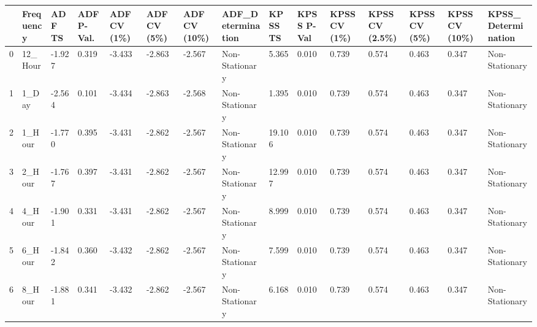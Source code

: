 \begin{tabular}{lllllllllllllll}
\toprule
 & Frequency & ADF TS & ADF P-Val. & ADF CV (1\%) & ADF CV (5\%) & ADF CV (10\%) & ADF_Determination & KPSS TS & KPSS P-Val & KPSS CV (1\%) & KPSS CV (2.5\%) & KPSS CV (5\%) & KPSS CV (10\%) & KPSS_Determination \\
\midrule
0 & 12_Hour & -1.927 & 0.319 & -3.433 & -2.863 & -2.567 & Non-Stationary & 5.365 & 0.010 & 0.739 & 0.574 & 0.463 & 0.347 & Non-Stationary \\
1 & 1_Day & -2.564 & 0.101 & -3.434 & -2.863 & -2.568 & Non-Stationary & 1.395 & 0.010 & 0.739 & 0.574 & 0.463 & 0.347 & Non-Stationary \\
2 & 1_Hour & -1.770 & 0.395 & -3.431 & -2.862 & -2.567 & Non-Stationary & 19.106 & 0.010 & 0.739 & 0.574 & 0.463 & 0.347 & Non-Stationary \\
3 & 2_Hour & -1.767 & 0.397 & -3.431 & -2.862 & -2.567 & Non-Stationary & 12.997 & 0.010 & 0.739 & 0.574 & 0.463 & 0.347 & Non-Stationary \\
4 & 4_Hour & -1.901 & 0.331 & -3.431 & -2.862 & -2.567 & Non-Stationary & 8.999 & 0.010 & 0.739 & 0.574 & 0.463 & 0.347 & Non-Stationary \\
5 & 6_Hour & -1.842 & 0.360 & -3.432 & -2.862 & -2.567 & Non-Stationary & 7.599 & 0.010 & 0.739 & 0.574 & 0.463 & 0.347 & Non-Stationary \\
6 & 8_Hour & -1.881 & 0.341 & -3.432 & -2.862 & -2.567 & Non-Stationary & 6.168 & 0.010 & 0.739 & 0.574 & 0.463 & 0.347 & Non-Stationary \\
\bottomrule
\end{tabular}

